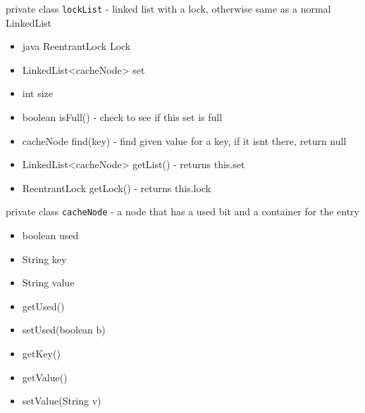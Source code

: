 private class \texttt{lockList} - linked list with a lock, otherwise same as a normal LinkedList
\begin{itemize}
\item java ReentrantLock Lock
\item LinkedList<cacheNode> set
\item int size
\item boolean isFull() - check to see if this set is full
\item cacheNode find(key) - find given value for a key, if it isnt there, return null
\item LinkedList<cacheNode> getList() - returns this.set
\item ReentrantLock getLock() - returns this.lock
\end{itemize}

private class \texttt{cacheNode} - a node that has a used bit and a container for the entry
\begin{itemize}
\item boolean used
\item String key
\item String value 
\item getUsed()
\item setUsed(boolean b)
\item getKey()
\item getValue()
\item setValue(String v)
\end{itemize}

